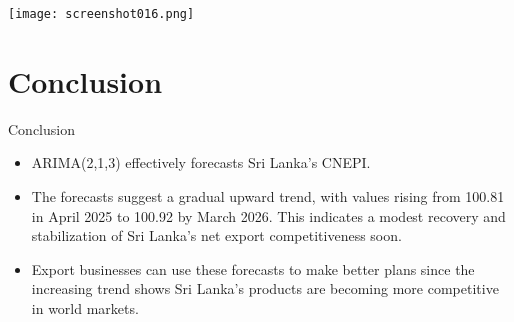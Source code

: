 \documentclass[11pt]{beamer}
\begin{document}
	\begin{frame}
		\graphicspath{{C:/Users/MSI/OneDrive/Attachments/Pictures/}}
		\texttt{[image: screenshot016.png]}
	\end{frame}
	
	
	\section{Conclusion}
	\begin{frame}{Conclusion}
		\begin{itemize}
			\item ARIMA(2,1,3) effectively forecasts Sri Lanka’s CNEPI.
			\end{itemize}	
			\vspace{0.5cm}
				\begin{itemize}
			\item The forecasts suggest a gradual
			upward trend, with values rising from 100.81 in April 2025 to 100.92 by March 2026. This
			indicates a modest recovery and stabilization of Sri Lanka’s net export competitiveness
			soon.
				\end{itemize}
			\vspace{0.5cm}
				\begin{itemize}
			\item Export businesses
			can use these forecasts to make better plans since the increasing trend shows Sri Lanka’s
			products are becoming more competitive in world markets.
		\end{itemize}
		
	\end{frame}
	
\end{document}
